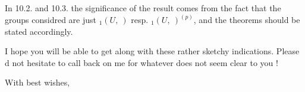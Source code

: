 In 10.2. and 10.3. the significance of the result comes from the fact that the groups considred are just ${}_1(U,\ )$ resp. ${}_1(U,\ )^{(p)}$, and the theorems should be stated accordingly.

I hope you will be able to get along with these rather sketchy indications. Please d not hesitate to call back on me for whatever does not seem clear to you !

With best wishes,\\
